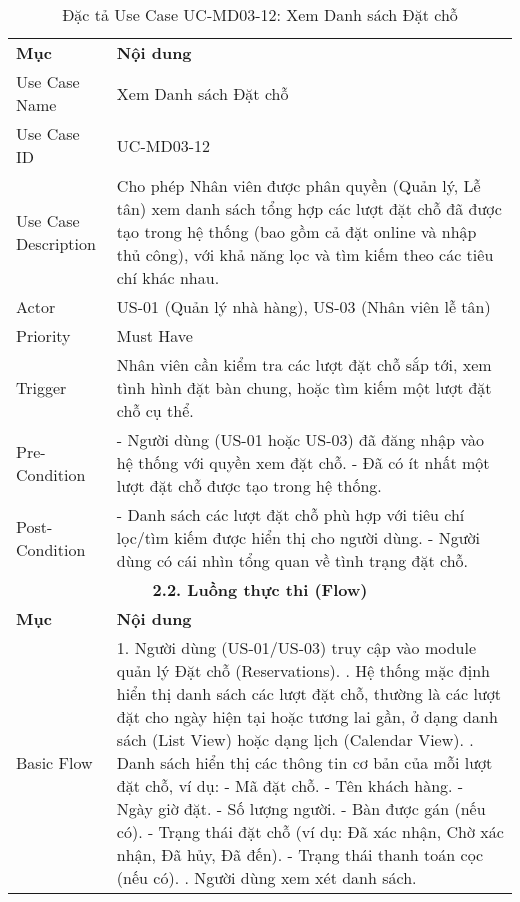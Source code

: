 \begin{longtable}{|m{4cm}|p{11cm}|}
\caption{Đặc tả Use Case UC-MD03-12: Xem Danh sách Đặt chỗ} \label{tab:uc_md03_12} \\
\hline

\endhead %
\hline
\endfoot %
\hline
\endlastfoot %
\multicolumn{2}{|c|}{\textbf{2.1. Tóm tắt (Summary)}} \\
\hline
\textbf{Mục} & \textbf{Nội dung} \\
\hline
Use Case Name & Xem Danh sách Đặt chỗ \\
\hline
Use Case ID & UC-MD03-12 \\
\hline
Use Case Description & Cho phép Nhân viên được phân quyền (Quản lý, Lễ tân) xem danh sách tổng hợp các lượt đặt chỗ đã được tạo trong hệ thống (bao gồm cả đặt online và nhập thủ công), với khả năng lọc và tìm kiếm theo các tiêu chí khác nhau. \\
\hline
Actor & US-01 (Quản lý nhà hàng), US-03 (Nhân viên lễ tân) \\
\hline
Priority & Must Have \\
\hline
Trigger & Nhân viên cần kiểm tra các lượt đặt chỗ sắp tới, xem tình hình đặt bàn chung, hoặc tìm kiếm một lượt đặt chỗ cụ thể. \\
\hline
Pre-Condition & - Người dùng (US-01 hoặc US-03) đã đăng nhập vào hệ thống với quyền xem đặt chỗ. \newline - Đã có ít nhất một lượt đặt chỗ được tạo trong hệ thống. \\
\hline
Post-Condition & - Danh sách các lượt đặt chỗ phù hợp với tiêu chí lọc/tìm kiếm được hiển thị cho người dùng. \newline - Người dùng có cái nhìn tổng quan về tình trạng đặt chỗ. \\
\hline
\multicolumn{2}{|c|}{\textbf{2.2. Luồng thực thi (Flow)}} \\
\hline
\textbf{Mục} & \textbf{Nội dung} \\
\hline
Basic Flow & 1. Người dùng (US-01/US-03) truy cập vào module quản lý Đặt chỗ (Reservations). \newline 2. Hệ thống mặc định hiển thị danh sách các lượt đặt chỗ, thường là các lượt đặt cho ngày hiện tại hoặc tương lai gần, ở dạng danh sách (List View) hoặc dạng lịch (Calendar View). \newline 3. Danh sách hiển thị các thông tin cơ bản của mỗi lượt đặt chỗ, ví dụ: \newline    - Mã đặt chỗ. \newline    - Tên khách hàng. \newline    - Ngày giờ đặt. \newline    - Số lượng người. \newline    - Bàn được gán (nếu có). \newline    - Trạng thái đặt chỗ (ví dụ: Đã xác nhận, Chờ xác nhận, Đã hủy, Đã đến). \newline    - Trạng thái thanh toán cọc (nếu có). \newline 4. Người dùng xem xét danh sách. \\

\end{longtable}
